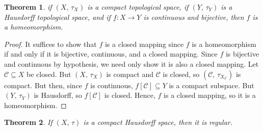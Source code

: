 \documentclass{article}
\theoremstyle{plain}
\newtheorem{theorem}{Theorem}[section]
\theoremstyle{normal}
\begin{document}
        \begin{theorem}
            if $(X,\,\tau_{X})$ is a compact topological space, if
            $(Y,\,\tau_{Y})$ is a Hausdorff topological space, and if
            $f:X\rightarrow{Y}$ is continuous and bijective, then $f$ is a
            homeomorphism.
        \end{theorem}
        \begin{proof}
            It suffices to show that $f$ is a closed mapping since $f$ is a
            homeomorphism if and only if it is bijective, continuous, and a
            closed mapping. Since $f$ is bijective and continuous by
            hypothesis, we need only show it is also a closed mapping.
            Let $\mathcal{C}\subseteq{X}$ be closed. But $(X,\,\tau_{X})$ is
            compact and $\mathcal{C}$ is closed, so
            $(\mathcal{C},\,\tau_{X_{\mathcal{C}}})$ is compact. But then, since
            $f$ is continuous, $f[\mathcal{C}]\subseteq{Y}$ is a compact
            subspace. But $(Y,\,\tau_{Y})$ is Hausdorff, so $f[\mathcal{C}]$ is
            closed. Hence, $f$ is a closed mapping, so it is a homeomorphism.
        \end{proof}
        \begin{theorem}
            If $(X,\,\tau)$ is a compact Hausdorff space, then it is regular.
        \end{theorem}
\end{document}
